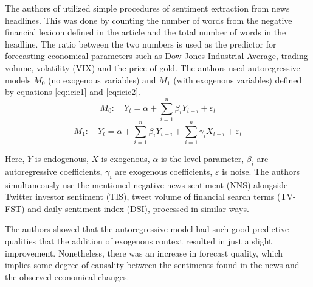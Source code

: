 \documentclass[3p,times,procedia]{elsarticle}
\begin{document}
The authors of \cite{mao2011predicting} utilized simple procedures of sentiment extraction from news headlines. This was done by counting the number of words from the negative financial lexicon defined in the article \cite{loughran2011liability} and the total number of words in the headline. The ratio between the two numbers is used as the predictor for forecasting economical parameters such as Dow Jones Industrial Average, trading volume, volatility (VIX) and the price of gold. The authors used autoregressive models $M_0$ (no exogenous variables) and $M_1$ (with exogenous variables) defined by equations \ref{eq:icic1} and \ref{eq:icic2}.
\begin{equation} \label{eq:icic1}
M_0: \quad Y_t = \alpha + \sum_{i=1}^n \beta_i Y_{t-i} + \varepsilon_t
\end{equation}
\begin{equation} \label{eq:icic2}
M_1: \quad Y_t = \alpha + \sum_{i=1}^n \beta_i Y_{t-i} + \sum_{i=1}^n \gamma_i X_{t-i} + \varepsilon_t
\end{equation}

Here, $Y$ is endogenous, $X$ is exogenous, $\alpha$ is the level parameter, $\beta_i$ are autoregressive coefficients, $\gamma_i$ are exogenous coefficients, $\varepsilon$ is noise. The authors simultaneously use the mentioned negative news sentiment (NNS) alongside Twitter investor sentiment (TIS), tweet volume of financial search terms (TV-FST) and daily sentiment index (DSI), processed in similar ways.

The authors showed that the autoregressive model had such good predictive qualities that the addition of exogenous context resulted in just a slight improvement. Nonetheless, there was an increase in forecast quality, which implies some degree of causality between the sentiments found in the news and the observed economical changes. 
\end{document}
